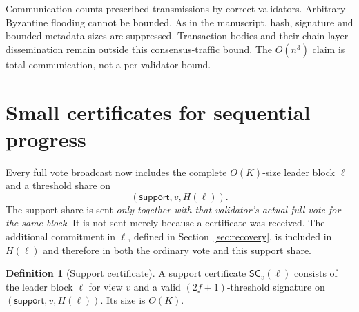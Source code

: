 \documentclass[11pt,a4paper]{article}
\theoremstyle{definition}
\newtheorem{definition}[theorem]{Definition}
\newcommand{\SC}{\mathsf{SC}}
\newcommand{\supp}{\mathsf{support}}
\begin{document}
Communication counts prescribed transmissions by correct validators.
Arbitrary Byzantine flooding cannot be bounded. As in the manuscript, hash,
signature and bounded metadata sizes are suppressed. Transaction bodies and
their chain-layer dissemination remain outside this consensus-traffic bound.
The \(O(n^3)\) claim is total communication, not a per-validator bound.

\section{Small certificates for sequential progress}
\label{sec:progress}

Every full vote broadcast now includes the complete \(O(K)\)-size leader
block \(\ell\) and a threshold share on
\[
  (\supp,v,H(\ell)).
\]
The support share is sent \emph{only together with that validator's actual
full vote for the same block}. It is not sent merely because a certificate
was received. The additional commitment in \(\ell\), defined in
Section~\ref{sec:recovery}, is included in \(H(\ell)\) and therefore in both
the ordinary vote and this support share.

\begin{definition}[Support certificate]
A support certificate \(\SC_v(\ell)\) consists of the leader block \(\ell\)
for view \(v\) and a valid \((2f+1)\)-threshold signature on
\((\supp,v,H(\ell))\). Its size is \(O(K)\).
\end{definition}
\end{document}
